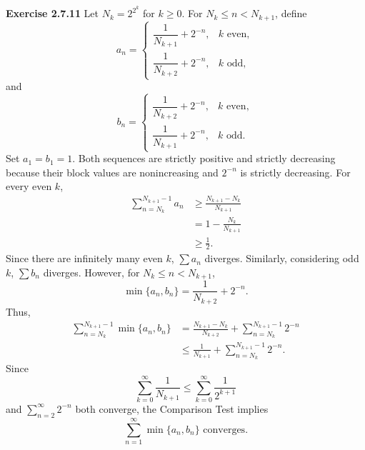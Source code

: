 \documentclass[12pt]{article}
\begin{document}
\textbf{Exercise 2.7.11}
Let \(N_k=2^{2^k}\) for \(k\ge0\). For \(N_k\le n<N_{k+1}\), define
\[
    a_n=
    \begin{cases}
        \dfrac{1}{N_{k+1}}+2^{-n}, & k\text{ even}, \\[6pt]
        \dfrac{1}{N_{k+2}}+2^{-n}, & k\text{ odd},
    \end{cases}
\]
and
\[
    b_n=
    \begin{cases}
        \dfrac{1}{N_{k+2}}+2^{-n}, & k\text{ even}, \\[6pt]
        \dfrac{1}{N_{k+1}}+2^{-n}, & k\text{ odd}.
    \end{cases}
\]
Set \(a_1=b_1=1\). Both sequences are strictly positive and strictly decreasing because their block values are nonincreasing and \(2^{-n}\) is strictly decreasing.
For every even \(k\),
\[
    \begin{aligned}
        \sum_{n=N_k}^{N_{k+1}-1}a_n
         & \ge\frac{N_{k+1}-N_k}{N_{k+1}} \\
         & =1-\frac{N_k}{N_{k+1}}         \\
         & \ge\frac12.
    \end{aligned}
\]
Since there are infinitely many even \(k\), \(\sum a_n\) diverges. Similarly, considering odd \(k\), \(\sum b_n\) diverges.
However, for \(N_k\le n<N_{k+1}\),
\[
    \min\{a_n,b_n\}=\frac1{N_{k+2}}+2^{-n}.
\]
Thus,
\[
    \begin{aligned}
        \sum_{n=N_k}^{N_{k+1}-1}\min\{a_n,b_n\}
         & =\frac{N_{k+1}-N_k}{N_{k+2}}
        +\sum_{n=N_k}^{N_{k+1}-1}2^{-n} \\
         & \le\frac1{N_{k+1}}
        +\sum_{n=N_k}^{N_{k+1}-1}2^{-n}.
    \end{aligned}
\]
Since
\[
    \sum_{k=0}^{\infty}\frac1{N_{k+1}}
    \le\sum_{k=0}^{\infty}\frac1{2^{k+1}}
\]
and \(\sum_{n=2}^{\infty}2^{-n}\) both converge, the Comparison Test implies
\[
    \sum_{n=1}^{\infty}\min\{a_n,b_n\}\text{ converges.}
\]
\end{document}
